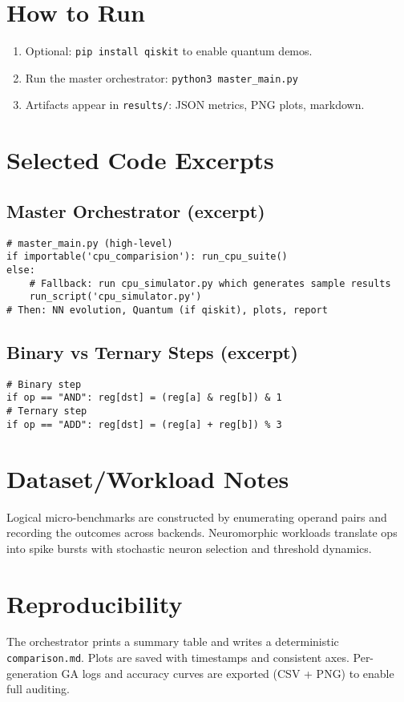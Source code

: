 \documentclass[11pt,a4paper]{article}
\newcommand{\code}[1]{\texttt{#1}}
\begin{document}
\appendix
\section{How to Run}
\label{app:run}
\begin{enumerate}[leftmargin=1.25em]
  \item Optional: \code{pip install qiskit} to enable quantum demos.
  \item Run the master orchestrator: \code{python3 master\_main.py}
  \item Artifacts appear in \code{results/}: JSON metrics, PNG plots, markdown.
\end{enumerate}

\section{Selected Code Excerpts}
\subsection*{Master Orchestrator (excerpt)}
\begin{lstlisting}
# master_main.py (high-level)
if importable('cpu_comparision'): run_cpu_suite()
else:
    # Fallback: run cpu_simulator.py which generates sample results
    run_script('cpu_simulator.py')
# Then: NN evolution, Quantum (if qiskit), plots, report
\end{lstlisting}

\subsection*{Binary vs Ternary Steps (excerpt)}
\begin{lstlisting}
# Binary step
if op == "AND": reg[dst] = (reg[a] & reg[b]) & 1
# Ternary step
if op == "ADD": reg[dst] = (reg[a] + reg[b]) % 3
\end{lstlisting}

\section{Dataset/Workload Notes}
Logical micro-benchmarks are constructed by enumerating operand pairs and
recording the outcomes across backends. Neuromorphic workloads translate ops
into spike bursts with stochastic neuron selection and threshold dynamics.

\section{Reproducibility}
The orchestrator prints a summary table and writes a deterministic
\code{comparison.md}. Plots are saved with timestamps and consistent axes.
Per-generation GA logs and accuracy curves are exported (CSV + PNG) to enable
full auditing.

\end{document}
